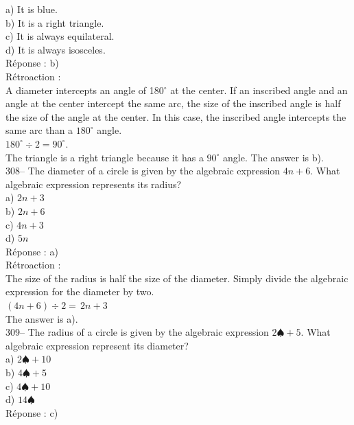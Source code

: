 \documentclass[letterpaper, 12pt]{article}
\begin{document}
a) It is blue.\\
b) It is a right triangle.\\
c) It is always equilateral.\\
d) It is always isosceles.\\

R\'eponse : b)\\

R\'etroaction :\\
A diameter intercepts an angle of 180$^{\circ}$ at the center. If an inscribed angle and an angle at the center intercept the same arc,
the size of the inscribed angle is half the size of the angle at the center. In this case, the inscribed angle intercepts the same arc than a $180^{\circ}$ angle.\\
$180^{\circ}\div2=90^{\circ}.$\\
The triangle is a right triangle because it has a $90^{\circ}$ angle. The answer is b).\\


308-- The diameter of a circle is given by the algebraic expression $4n+6$. What algebraic expression represents its radius?\\

a) $2n+3$\\
b) $2n+6$\\
c) $4n+3$\\
d) $5n$\\

R\'eponse : a)\\

R\'etroaction :\\
The size of the radius is half the size of the diameter. Simply divide the algebraic expression for the diameter by two.\\
$\left( 4n+6\right) \div2=\,2n+3$\\
The answer is a).\\


309-- The radius of a circle is given by the algebraic expression $2\spadesuit+5$. What algebraic expression represent its diameter? \\

a) $2\spadesuit+10$\\
b) $4\spadesuit+5$\\
c) $4\spadesuit+10$\\
d) $14\spadesuit$\\

R\'eponse : c)\\
\end{document}

